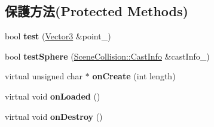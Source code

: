 \subsection*{保護方法(Protected Methods)}
\begin{DoxyCompactItemize}
\item 
bool {\bfseries test} (\hyperlink{class_magnum_1_1_vector3}{Vector3} \&point\+\_\+)\hypertarget{class_magnum_1_1_scene_collision_1_1_resource_aae76dc9a46306dc2ebcc7df6b523e2dd}{}\label{class_magnum_1_1_scene_collision_1_1_resource_aae76dc9a46306dc2ebcc7df6b523e2dd}

\item 
bool {\bfseries test\+Sphere} (\hyperlink{class_magnum_1_1_scene_collision_1_1_cast_info}{Scene\+Collision\+::\+Cast\+Info} \&cast\+Info\+\_\+)\hypertarget{class_magnum_1_1_scene_collision_1_1_resource_a09049984f9f5b6c17419c2dba0dd5da5}{}\label{class_magnum_1_1_scene_collision_1_1_resource_a09049984f9f5b6c17419c2dba0dd5da5}

\item 
virtual unsigned char $\ast$ {\bfseries on\+Create} (int length)\hypertarget{class_magnum_1_1_scene_collision_1_1_resource_a90459b7b2792c008582c7b8d15842111}{}\label{class_magnum_1_1_scene_collision_1_1_resource_a90459b7b2792c008582c7b8d15842111}

\item 
virtual void {\bfseries on\+Loaded} ()\hypertarget{class_magnum_1_1_scene_collision_1_1_resource_af01d75d3c8ed2ae8ff44f90fbdc9d631}{}\label{class_magnum_1_1_scene_collision_1_1_resource_af01d75d3c8ed2ae8ff44f90fbdc9d631}

\item 
virtual void {\bfseries on\+Destroy} ()\hypertarget{class_magnum_1_1_scene_collision_1_1_resource_a9ff4bc2efd41b687e89a90c509e4fb1b}{}\label{class_magnum_1_1_scene_collision_1_1_resource_a9ff4bc2efd41b687e89a90c509e4fb1b}

\end{DoxyCompactItemize}
